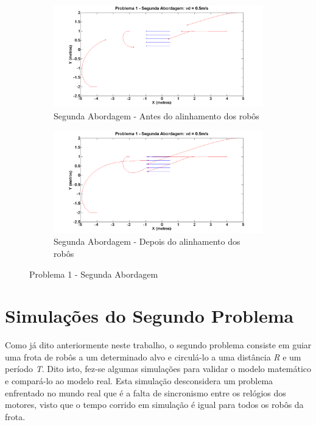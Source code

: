 \begin{figure}[!htb]
	\centering
	\begin{subfigure}{1.0\textwidth}
		\centering
		\includegraphics[width=.9\linewidth]{./04-figuras/Simulacoes/Problema1-Abordagem1/P1A2Inicio}
		\caption{Segunda Abordagem - Antes do alinhamento dos robôs}
		\label{fig:P1A2Ini}
	\end{subfigure}
	\begin{subfigure}{1.0\textwidth}
		\centering
		\includegraphics[width=.9\linewidth]{./04-figuras/Simulacoes/Problema1-Abordagem1/P1A2Fim}
		\caption{Segunda Abordagem - Depois do alinhamento dos robôs}
		\label{fig:P1A2Fim}
	\end{subfigure}
	\caption{Problema 1 - Segunda Abordagem}
	\label{fig:sP1A2}
\end{figure}

\section{Simulações do Segundo Problema}
\label{sec:SimulacaoP2}
Como já dito anteriormente neste trabalho, o segundo problema consiste em guiar uma frota de robôs a um determinado alvo e circulá-lo a uma distância \emph{R} e um período \emph{T}. Dito isto, fez-se algumas simulações para validar o modelo matemático e compará-lo ao modelo real. Esta simulação desconsidera um problema enfrentado no mundo real que é a falta de sincronismo entre os relógios dos motores, visto que o tempo corrido em simulação é igual para todos os robôs da frota. 

